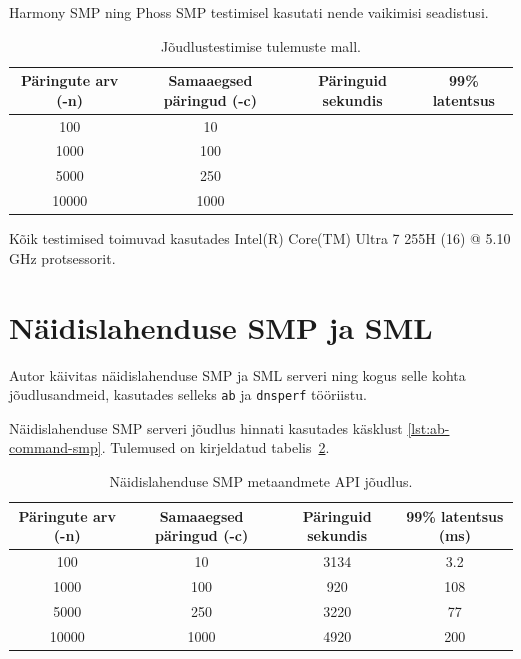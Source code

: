 Harmony SMP ning Phoss SMP testimisel kasutati nende vaikimisi seadistusi.

\begin{table}[H]
    \caption{Jõudlustestimise tulemuste mall.}
    \label{tab:performance-table-template}
    \begin{tabular}{|c|c|c|c|}
        \hline
        Päringute arv (-n) & Samaaegsed päringud (-c) & Päringuid sekundis & 99\% latentsus \\
        \hline
        100 & 10 &  &  \\
        \hline
        1000 & 100 &  &  \\
        \hline
        5000 & 250 &  &  \\
        \hline
        10000 & 1000 &  &  \\
        \hline
    \end{tabular}
\end{table}

Kõik testimised toimuvad kasutades Intel(R) Core(TM) Ultra 7 255H (16) @ 5.10 GHz protsessorit.


\section{Näidislahenduse SMP ja SML}
Autor käivitas näidislahenduse SMP ja SML serveri ning kogus selle kohta jõudlusandmeid, kasutades selleks
\texttt{ab} ja \texttt{dnsperf} tööriistu.

Näidislahenduse SMP serveri jõudlus hinnati kasutades käsklust \ref{lst:ab-command-smp}.
Tulemused on kirjeldatud tabelis~\ref{tab:poc-smp-performance-results}.

\begin{table}[H]
    \caption{Näidislahenduse SMP metaandmete API jõudlus.}
    \label{tab:poc-smp-performance-results}
    \begin{tabular}{|c|c|c|c|}
        \hline
        Päringute arv (-n) & Samaaegsed päringud (-c) & Päringuid sekundis & 99\% latentsus (ms) \\
        \hline
        100 & 10 & 3134 & 3.2 \\
        \hline
        1000 & 100 & 920 & 108 \\
        \hline
        5000 & 250 & 3220 & 77 \\
        \hline
        10000 & 1000 & 4920 & 200 \\
        \hline
    \end{tabular}
\end{table}

